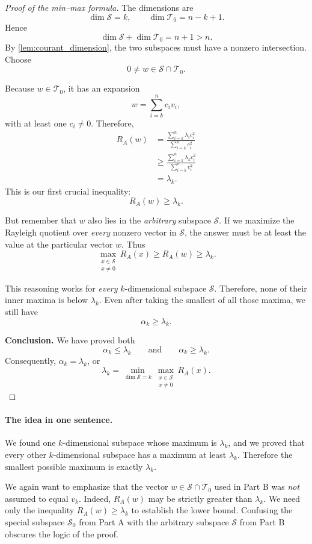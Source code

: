 \documentclass[14pt,letterpaper]{article}
\theoremstyle{plain}
\theoremstyle{definition}
\theoremstyle{remark}
\begin{document}
\begin{proof}[Proof of the min--max formula]
The dimensions are
\[
\dim\mathcal S=k,
\qquad
\dim\mathcal T_0=n-k+1.
\]
Hence
\[
\dim\mathcal S+\dim\mathcal T_0=n+1>n.
\]
By \cref{lem:courant_dimension}, the two subspaces
must have a nonzero intersection. Choose
\[
\boxed{0\neq w\in\mathcal S\cap\mathcal T_0.}
\]

Because $w\in\mathcal T_0$, it has an expansion
\[
w=\sum_{i=k}^n c_i v_i,
\]
with at least one $c_i\neq0$. Therefore,
\[
\begin{aligned}
R_A(w)
&=\frac{\sum_{i=k}^n\lambda_i c_i^2}
         {\sum_{i=k}^n c_i^2}\\[3pt]
&\geq\frac{\sum_{i=k}^n\lambda_k c_i^2}
          {\sum_{i=k}^n c_i^2}\\[3pt]
&=\lambda_k.
\end{aligned}
\]
This is our first crucial inequality:
\[
\boxed{R_A(w)\geq\lambda_k.}
\]

But remember that $w$ also lies in the \emph{arbitrary}
subspace $\mathcal S$. If we maximize the Rayleigh
quotient over \emph{every} nonzero vector in
$\mathcal S$, the answer must be at least the value
at the particular vector $w$. Thus
\[
\boxed{
\max_{\substack{x\in\mathcal S\\x\neq0}}R_A(x)
\geq R_A(w)\geq\lambda_k.
}
\]

This reasoning works for \emph{every}
$k$-dimensional subspace $\mathcal S$. Therefore,
none of their inner maxima is below $\lambda_k$.
Even after taking the smallest of all those maxima,
we still have
\[
\boxed{\alpha_k\geq\lambda_k.}
\]

\medskip
\noindent\textbf{Conclusion.}\quad
We have proved both
\[
\alpha_k\leq\lambda_k
\qquad\text{and}\qquad
\alpha_k\geq\lambda_k.
\]
Consequently, $\alpha_k=\lambda_k$, or
\[
\boxed{
\lambda_k=
\min_{\dim\mathcal S=k}
\max_{\substack{x\in\mathcal S\\x\neq0}}R_A(x).
}
\]
\end{proof}

\paragraph{The idea in one sentence.}
We found one $k$-dimensional subspace whose maximum
is $\lambda_k$, and we proved that every other
$k$-dimensional subspace has a maximum at least
$\lambda_k$. Therefore the smallest possible
maximum is exactly $\lambda_k$.


We again want to emphasize that the vector $w\in\mathcal S\cap\mathcal T_0$ used in
Part B was \emph{not} assumed to equal $v_k$.
Indeed, $R_A(w)$ may be strictly greater than
$\lambda_k$. We need only the inequality
$R_A(w)\geq\lambda_k$ to establish the lower bound.
Confusing the special subspace $\mathcal S_0$ from
Part A with the arbitrary subspace $\mathcal S$
from Part B obscures the logic of the proof.
\end{document}
